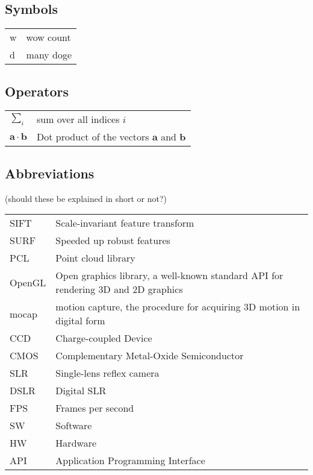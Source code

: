 
\subsection*{Symbols}

\begin{tabular}{ll}
w	& wow count\\
d	& many doge
\end{tabular}


\subsection*{Operators}

\begin{tabular}{ll}
$\sum_i $                        & sum over all indices $i$\\
$\mathbf{a} \cdot \mathbf{b}$    & Dot product of the vectors $\mathbf{a}$ and $\mathbf{b}$
\end{tabular}

\subsection*{Abbreviations}

(should these be explained in short or not?)

\begin{tabular}{ll}
	SIFT & Scale-invariant feature transform\\
	SURF & Speeded up robust features \\
	PCL & Point cloud library\\
	OpenGL & Open graphics library, a well-known standard API for rendering 3D and 2D graphics\\
	mocap & motion capture, the procedure for acquiring 3D motion in digital form\\
	CCD & Charge-coupled Device\\
	CMOS & Complementary Metal-Oxide Semiconductor\\
	SLR & Single-lens reflex camera\\
	DSLR & Digital SLR\\
	FPS & Frames per second\\
	SW & Software\\
	HW & Hardware\\
	API & Application Programming Interface\\
\end{tabular}

